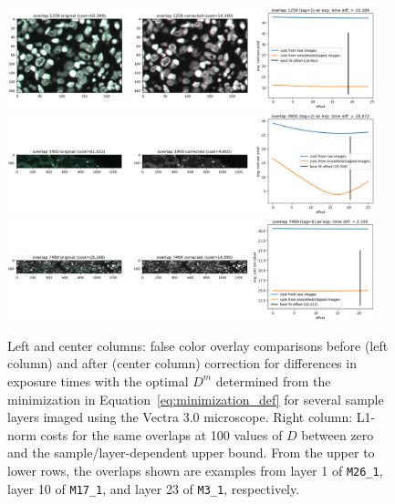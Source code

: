 \documentclass[letterpaper,11pt]{article}
\newcommand{\refeq}[1]{Equation~\ref{#1}}
\begin{document}
\begin{figure}[!ht]
\centering
\includegraphics[width=0.95\textwidth]{images/methods/cost_examples_vectra/overlay_comp_random_6761_offset=18.961}
\includegraphics[width=0.95\textwidth]{images/methods/cost_examples_vectra/overlay_comp_random_2425_offset=20.326}
\includegraphics[width=0.95\textwidth]{images/methods/cost_examples_vectra/overlay_comp_random_3946_offset=20.222}
\caption{\footnotesize Left and center columns: false color overlay comparisons before (left column) and after (center column) correction for differences in exposure times with the optimal $D^{m}$ determined from the minimization in \refeq{eq:minimization_def} for several sample layers imaged using the Vectra 3.0 microscope. Right column: L1-norm costs for the same overlaps at 100 values of $D$ between zero and the sample/layer-dependent upper bound. From the upper to lower rows, the overlaps shown are examples from layer 1 of \texttt{M26\_1}, layer 10 of \texttt{M17\_1}, and layer 23 of \texttt{M3\_1}, respectively.}
\label{fig:overlap_cost_examples_vectra_1}
\end{figure}
\end{document}
